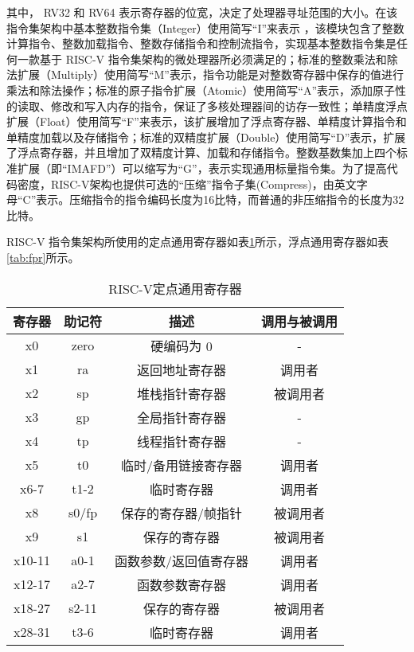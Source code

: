 其中， RV32 和 RV64 表示寄存器的位宽，决定了处理器寻址范围的大小。在该指令集架构中基本整数指令集（Integer）使用简写“I”来表示 ，该模块包含了整数计算指令、整数加载指令、整数存储指令和控制流指令，实现基本整数指令集是任何一款基于 RISC-V 指令集架构的微处理器所必须满足的；标准的整数乘法和除法扩展（Multiply）使用简写“M”表示，指令功能是对整数寄存器中保存的值进行乘法和除法操作；标准的原子指令扩展（Atomic）使用简写“A”表示，添加原子性的读取、修改和写入内存的指令，保证了多核处理器间的访存一致性；单精度浮点扩展（Float）使用简写“F”来表示，该扩展增加了浮点寄存器、单精度计算指令和单精度加载以及存储指令；标准的双精度扩展（Double）使用简写“D”表示，扩展了浮点寄存器，并且增加了双精度计算、加载和存储指令。整数基数集加上四个标准扩展（即“IMAFD”）可以缩写为“G”，表示实现通用标量指令集。为了提高代码密度，RISC-V架构也提供可选的“压缩”指令子集(Compress)，由英文字母“C”表示。压缩指令的指令编码长度为16比特，而普通的非压缩指令的长度为32比特。


RISC-V 指令集架构所使用的定点通用寄存器如表\ref{tab:xpr}所示，浮点通用寄存器如表\ref{tab:fpr}所示。
\begin{table}[h]
  \centering
  \caption{RISC-V定点通用寄存器}
  \label{tab:xpr}
  \begin{tabular}{cccc}
    \toprule
寄存器 &	助记符	& 描述 &	调用与被调用\\
    \midrule
    x0 & zero & 硬编码为 0 & -\\
    x1 & ra & 返回地址寄存器 & 调用者\\
    x2 & sp & 堆栈指针寄存器 & 被调用者\\
    x3 & gp & 全局指针寄存器 & -\\
    x4 & tp & 线程指针寄存器 & -\\
    x5 & t0 & 临时/备用链接寄存器 & 调用者\\
    x6-7 & t1-2 & 临时寄存器 & 调用者\\
    x8 & s0/fp & 保存的寄存器/帧指针 & 被调用者\\
    x9 & s1 & 保存的寄存器 & 被调用者\\
    x10-11 & a0-1 & 函数参数/返回值寄存器 & 调用者\\
    x12-17 & a2-7 & 函数参数寄存器 & 调用者\\
    x18-27 & s2-11 & 保存的寄存器 & 被调用者\\
    x28-31	& t3-6 & 临时寄存器 & 调用者\\
    \bottomrule
  \end{tabular}
\end{table}


